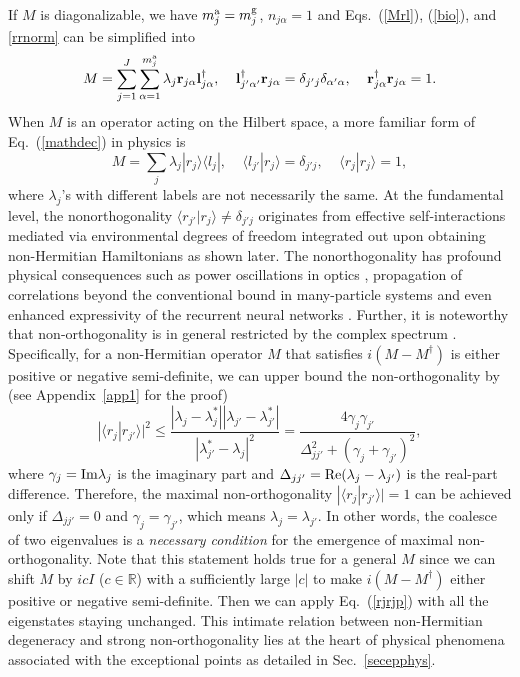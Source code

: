 \documentclass{tADP2e}
\theoremstyle{plain}
\theoremstyle{plain}
\theoremstyle{definition}
\begin{document}
If $M$ is diagonalizable, we have $m^{\rm a}_j=m^{\rm g}_j$, $n_{j\alpha}=1$ and Eqs.~(\ref{Mrl}), (\ref{bio}), and \eqref{rrnorm} can be simplified into
\begin{equation}
M=\sum^J_{j=1}\sum^{m^{\rm a}_j}_{\alpha=1}\lambda_j \bold{r}_{j\alpha}\bold{l}_{j\alpha}^\dag,\;\;\;\;
\bold{l}_{j'\alpha'}^\dag\bold{r}_{j\alpha}=\delta_{j'j}\delta_{\alpha'\alpha},\;\;\;\;\bold{r}_{j\alpha}^{\dagger}\bold{r}_{j\alpha}=1.
\label{mathdec}
\end{equation}
When $M$ is an operator acting on the Hilbert space, a more familiar form of Eq.~(\ref{mathdec}) in physics is
\begin{equation}
M=\sum_j \lambda_j| r_j\rangle\langle l_j|,\;\;\;\; \langle l_{j'} | r_j\rangle=\delta_{j'j},\;\;\;\; \langle r_{j}|r_j\rangle=1,
\label{NHdec}
\end{equation}
where $\lambda_j$'s with different labels are not necessarily the same. At the fundamental level, the nonorthogonality $\langle r_{j'}|r_j\rangle\neq\delta_{j'j}$ originates from effective self-interactions mediated via environmental degrees of freedom integrated out upon obtaining non-Hermitian Hamiltonians as shown later. The nonorthogonality has profound physical consequences such as power oscillations in optics \cite{KGM08,KS082,RCE10}, propagation of correlations beyond the conventional bound in many-particle systems \cite{YA18} and even enhanced expressivity of the recurrent neural networks \cite{KG19}. Further, it is noteworthy that non-orthogonality is in general restricted by the complex spectrum \cite{WJ19}. 
Specifically, for a non-Hermitian operator $M$ that satisfies $i(M-M^\dag)$ is either positive or negative semi-definite, we can upper bound the non-orthogonality by \cite{LTD57,LTD65,WJ19} (see Appendix~\ref{app1} for the proof)
\begin{equation}
|\langle r_j| r_{j'}\rangle|^2\le\frac{|\lambda_j-\lambda_j^*||\lambda_{j'}-\lambda_{j'}^*|}{|\lambda_{j'}^*-\lambda_j|^2}=\frac{4\gamma_j\gamma_{j'}}{\Delta_{jj'}^2+(\gamma_j+\gamma_{j'})^2},
\label{rjrjp}
\end{equation}
where $\gamma_j={\rm Im}\lambda_j$ is the imaginary part and $\Delta_{jj'}={\rm Re}(\lambda_j-\lambda_{j'})$ is the real-part difference. Therefore, the maximal non-orthogonality $|\langle r_j|r_{j'}\rangle|=1$ can be achieved only if $\Delta_{jj'}=0$ and $\gamma_j=\gamma_{j'}$, which means $\lambda_j=\lambda_{j'}$. In other words, the coalesce of two eigenvalues is a \emph{necessary condition} for the emergence of maximal non-orthogonality. Note that this statement holds true for a general $M$ since we can shift $M$ by $icI$ ($c\in\mathbb{R}$) with a sufficiently large $|c|$ to make $i(M-M^\dag)$ either positive or negative semi-definite. Then we can apply Eq.~(\ref{rjrjp}) with all the eigenstates staying unchanged.  This intimate relation between non-Hermitian degeneracy and strong non-orthogonality  lies at the heart of physical phenomena associated with the exceptional points as detailed in Sec.~\ref{secepphys}.
\end{document}
